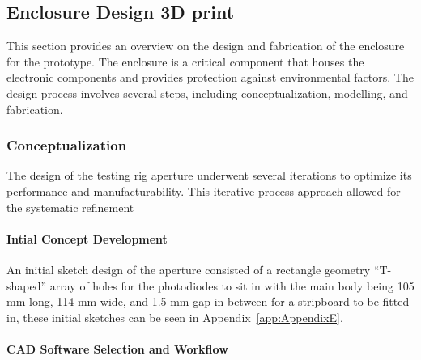 \subsection{Enclosure Design 3D print}  %
\label{subsec:enclosureDesign}
This section provides an overview on the design and fabrication of the enclosure for the prototype. 
The enclosure is a critical component that houses the electronic components and provides protection against environmental factors. 
The design process involves several steps, including conceptualization, modelling, and fabrication.


\subsubsection{Conceptualization}
The design of the testing rig aperture underwent several iterations to optimize its performance and manufacturability. 
This iterative process approach allowed for the systematic refinement

\paragraph{Intial Concept Development}

An initial sketch design of the aperture consisted of a rectangle geometry “T-shaped” array of holes for the photodiodes to sit in with the main body being 105 mm long, 114 mm wide, and 1.5 mm gap in-between for a stripboard to be fitted in, these initial sketches can be seen in Appendix~\ref{app:AppendixE}.

\paragraph{CAD Software Selection and Workflow} 

